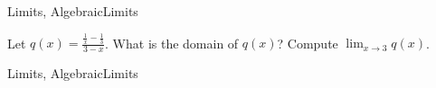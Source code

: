 

\begin{tagblock}{Limits, AlgebraicLimits}
\begin{question}
	 Let $\displaystyle q(x) = \frac{\frac{1}{x} - \frac{1}{3}}{3-x}$.  What is the domain of $q(x)$?   Compute $\displaystyle \lim_{x \to 3} q(x)$.\\
	
	
\begin{tags}
	    Limits, AlgebraicLimits
\end{tags}
	
\begin{diary}
	    
\end{diary}
	
\begin{solution}
	  
\end{solution}
	
\end{question}

\end{tagblock}



